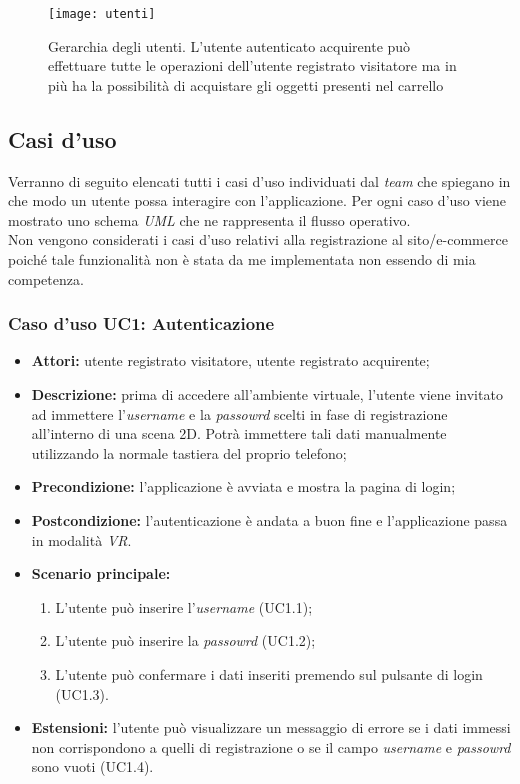 \label{Gerarchia utenti}
\begin{figure}[ht]
	\begin{center}
		\texttt{[image: utenti]}
		\caption{Gerarchia degli utenti. L'utente autenticato acquirente può effettuare tutte le operazioni dell'utente registrato visitatore ma in più ha la possibilità di acquistare gli oggetti presenti nel carrello}
	\end{center}
\end{figure}
\FloatBarrier

\subsection{Casi d'uso}

Verranno di seguito elencati tutti i casi d'uso individuati dal \textit{team} che spiegano in che modo un utente possa interagire con l'applicazione. Per ogni caso d'uso viene mostrato uno schema \textit{UML} che ne rappresenta il flusso operativo. \\ 
Non vengono considerati i casi d'uso relativi alla registrazione al sito/e-commerce poiché tale funzionalità non è stata da me implementata non essendo di mia competenza.

\subsubsection{Caso d'uso UC1: Autenticazione}

\begin{itemize}
	\item \textbf{Attori:} utente registrato visitatore, utente registrato acquirente;
	\item \textbf{Descrizione:} prima di accedere all'ambiente virtuale, l'utente viene invitato ad immettere l'\textit{username} e la \textit{passowrd} scelti in fase di registrazione all'interno di una scena 2D. Potrà immettere tali dati manualmente utilizzando la normale tastiera del proprio telefono;
	\item \textbf{Precondizione:} l'applicazione è avviata e mostra la pagina di login;
	\item \textbf{Postcondizione:} l'autenticazione è andata a buon fine e l'applicazione passa in modalità \textit{VR}.
	\item \textbf{Scenario principale:}
	\begin{enumerate}
		\item L'utente può inserire l'\textit{username} (UC1.1);
		\item L'utente può inserire la \textit{passowrd} (UC1.2);
		\item L'utente può confermare i dati inseriti premendo sul pulsante di login (UC1.3).
	\end{enumerate}
	\item \textbf{Estensioni:} l'utente può visualizzare un messaggio di errore se i dati immessi non corrispondono a quelli di registrazione o se il campo \textit{username} e \textit{passowrd} sono vuoti (UC1.4).
\end{itemize}

